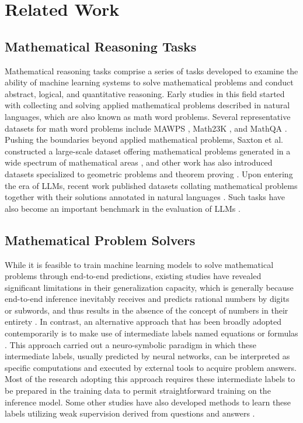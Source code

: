 \section{Related Work}
\subsection{Mathematical Reasoning Tasks}

Mathematical reasoning tasks comprise a series of tasks developed to examine the ability of machine learning systems to solve mathematical problems and conduct abstract, logical, and quantitative reasoning.
Early studies in this field started with collecting and solving applied mathematical problems described in natural languages, which are also known as math word problems.
Several representative datasets for math word problems include MAWPS \cite{mawps}, Math23K \cite{math23}, and MathQA \cite{mathqa}.
Pushing the boundaries beyond applied mathematical problems, 
Saxton et al. constructed a large-scale dataset offering mathematical problems generated in a wide spectrum of mathematical areas \cite{math_dm},
and other work has also introduced datasets specialized to geometric problems \cite{math_g0} and theorem proving \cite{math_atp,ldj}.
Upon entering the era of LLMs, recent work published datasets collating mathematical problems together with their solutions annotated in natural languages \cite{gsm8k}.
Such tasks have also become an important benchmark in the evaluation of LLMs \cite{mmlu}.

\subsection{Mathematical Problem Solvers}

While it is feasible to train machine learning models to solve mathematical problems through end-to-end predictions, 
existing studies have revealed significant limitations in their generalization capacity,
which is generally because end-to-end inference inevitably receives and predicts rational numbers by digits or subwords, and thus results in the absence of the concept of numbers in their entirety \cite{math_dm}.
In contrast, an alternative approach that has been broadly adopted contemporarily is to make use of intermediate labels named equations or formulas \cite{mawps,math23,mathqa}.
This approach carried out a neuro-symbolic paradigm in which these intermediate labels, usually predicted by neural networks, can be interpreted as specific computations and executed by external tools to acquire problem answers.
Most of the research adopting this approach requires these intermediate labels to be prepared in the training data to permit straightforward training on the inference model.
Some other studies have also developed methods to learn these labels utilizing weak supervision derived from questions and answers \cite{math_fix,coling}.



